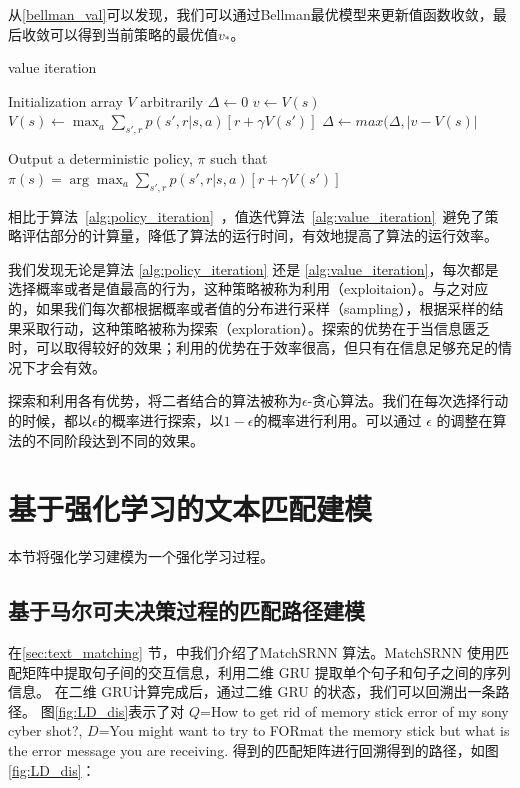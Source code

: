 从\eqref{bellman_val}可以发现，我们可以通过Bellman最优模型来更新值函数收敛，最后收敛可以得到当前策略的最优值$v_*$。

\begin{algorithm}[!htbp]
    \small
    \caption{value iteration}\label{alg:value_iteration}
    \begin{algorithmic}
        \STATE Initialization array $V$ arbitrarily
        \REPEAT
        \STATE $\Delta \leftarrow 0$
        \STATE $v \leftarrow V(s)$
        \STATE $V(s)\leftarrow \max_a\sum_{s', r} p(s', r|s, a)[r + \gamma V(s')]$
        \STATE $\Delta \leftarrow max(\Delta, |v-V(s)|$
        \ENDFOR
        \UNTIL {$\Delta < \theta$}

        \STATE Output a deterministic policy, $\pi$ such that
        \STATE $\pi(s) = \arg\max_a\sum_{s', r} p(s', r|s, a)[r + \gamma V(s')]$
    \end{algorithmic}
\end{algorithm}



相比于算法~\ref{alg:policy_iteration}~，值迭代算法~\ref{alg:value_iteration}~避免了策略评估部分的计算量，降低了算法的运行时间，有效地提高了算法的运行效率。

我们发现无论是算法 \ref{alg:policy_iteration} 还是 \ref{alg:value_iteration}，每次都是选择概率或者是值最高的行为，这种策略被称为利用（exploitaion）。与之对应的，如果我们每次都根据概率或者值的分布进行采样（sampling），根据采样的结果采取行动，这种策略被称为探索（exploration）。探索的优势在于当信息匮乏时，可以取得较好的效果；利用的优势在于效率很高，但只有在信息足够充足的情况下才会有效。

探索和利用各有优势，将二者结合的算法被称为$\epsilon$-贪心算法。我们在每次选择行动的时候，都以$\epsilon$的概率进行探索，以$1-\epsilon$的概率进行利用。可以通过 $\epsilon$ 的调整在算法的不同阶段达到不同的效果。


\section{基于强化学习的文本匹配建模}
\label{sec:TM_MDP}
本节将强化学习建模为一个强化学习过程。

\subsection{基于马尔可夫决策过程的匹配路径建模}

在\ref{sec:text_matching} 节，中我们介绍了MatchSRNN\cite{Wan2016MatchSRNNMT} 算法。MatchSRNN 使用匹配矩阵中提取句子间的交互信息，利用二维 GRU 提取单个句子和句子之间的序列信息。 在二维 GRU计算完成后，通过二维 GRU 的状态，我们可以回溯出一条路径。
图\ref{fig:LD_dis}表示了对 $Q$=How to get rid of memory stick error of my sony cyber shot?, $D$=You might want to try to FORmat the memory
stick but what is the error message you are receiving. 得到的匹配矩阵进行回溯得到的路径，如图\ref{fig:LD_dis}：

